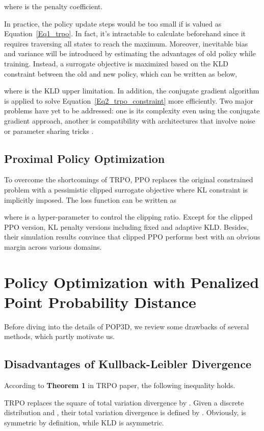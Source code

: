 \documentclass{article}
\begin{document}
where  is the penalty coefficient. 

In practice, the policy update steps would be too small if  is valued as Equation~\ref{Eq1_trpo}. In fact, it's intractable to calculate   beforehand since it requires traversing all states to reach the maximum. Moreover, inevitable bias and variance will be introduced by estimating the advantages of old policy while training. Instead, a surrogate objective is maximized based on the KLD constraint between the old and new policy, which can be written as below,


where  is the KLD upper limitation.  In addition, the conjugate gradient algorithm is applied to solve Equation~\ref{Eq2_trpo_constraint} more efficiently. Two major problems have yet to be addressed: one is its complexity even using the conjugate gradient approach, another is compatibility  with architectures that involve noise or parameter sharing tricks \cite{2017arXiv170706347S}.
\subsection{Proximal Policy Optimization}
To overcome the shortcomings of TRPO, PPO replaces the original constrained problem  with a pessimistic clipped surrogate objective where KL constraint is implicitly imposed. The loss function can be written as

where  is a hyper-parameter to control the clipping ratio.
Except for the clipped PPO version, KL penalty versions including fixed and adaptive KLD.  Besides, their simulation results convince that clipped PPO performs best with an obvious margin across various domains.

\section{Policy Optimization with Penalized Point Probability Distance}
Before diving into the details of POP3D,  we review some drawbacks of several methods, which partly motivate us.

\subsection{Disadvantages of Kullback-Leibler Divergence}


According to \textbf{Theorem 1} in TRPO paper, the following inequality holds.


TRPO replaces the square of total variation divergence  by . Given a discrete distribution  and , their total variation divergence  is defined by . Obviously,  is symmetric by definition, while KLD is  asymmetric.
\end{document}
